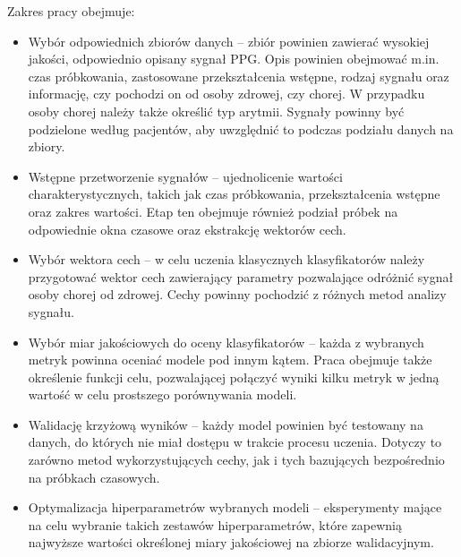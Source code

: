 \documentclass[a4paper,twoside,12pt]{book}
\begin{document}
Zakres pracy obejmuje:
\begin{itemize}
	\item Wybór odpowiednich zbiorów danych -- zbiór powinien zawierać wysokiej jakości, odpowiednio opisany sygnał PPG. Opis powinien obejmować m.in. czas próbkowania, zastosowane przekształcenia wstępne, rodzaj sygnału oraz informację, czy pochodzi on od osoby zdrowej, czy chorej. W przypadku osoby chorej należy także określić typ arytmii. Sygnały powinny być podzielone według pacjentów, aby uwzględnić to podczas podziału danych na zbiory.

	\item Wstępne przetworzenie sygnałów -- ujednolicenie wartości charakterystycznych, takich jak czas próbkowania, przekształcenia wstępne oraz zakres wartości. Etap ten obejmuje również podział próbek na odpowiednie okna czasowe oraz ekstrakcję wektorów cech.

	      \newpage
	\item Wybór wektora cech -- w celu uczenia klasycznych klasyfikatorów należy przygotować wektor cech zawierający parametry pozwalające odróżnić sygnał osoby chorej od zdrowej. Cechy powinny pochodzić z różnych metod analizy sygnału.

	\item Wybór miar jakościowych do oceny klasyfikatorów -- każda z wybranych metryk powinna oceniać modele pod innym kątem. Praca obejmuje także określenie funkcji celu, pozwalającej połączyć wyniki kilku metryk w jedną wartość w celu prostszego porównywania modeli.

	\item Walidację krzyżową wyników -- każdy model powinien być testowany na danych, do których nie miał dostępu w trakcie procesu uczenia. Dotyczy to zarówno metod wykorzystujących cechy, jak i tych bazujących bezpośrednio na próbkach czasowych.

	\item Optymalizacja hiperparametrów wybranych modeli -- eksperymenty mające na celu wybranie takich zestawów hiperparametrów, które zapewnią najwyższe wartości określonej miary jakościowej na zbiorze walidacyjnym.
\end{itemize}
\end{document}

